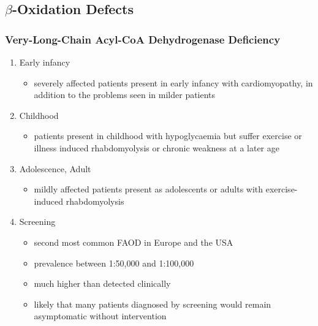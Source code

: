 \documentclass{scrartcl}
\begin{document}
\subsection{\(\beta\)-Oxidation Defects}
\label{sec:org9634dad}
\subsubsection{Very-Long-Chain Acyl-CoA Dehydrogenase Deficiency}
\label{sec:orgaae0151}
\begin{enumerate}
\item Early infancy
\label{sec:org3669950}
\begin{itemize}
\item severely affected patients present in early infancy with
cardiomyopathy, in addition to the problems seen in milder patients
\end{itemize}

\item Childhood
\label{sec:org2ffb412}
\begin{itemize}
\item patients present in childhood with hypoglycaemia but suffer exercise
or illness induced rhabdomyolysis or chronic weakness at a later age
\end{itemize}

\item Adolescence, Adult
\label{sec:orgd1780c0}
\begin{itemize}
\item mildly affected patients present as adolescents or adults with
exercise-induced rhabdomyolysis
\end{itemize}

\item Screening
\label{sec:org758c8eb}
\begin{itemize}
\item second most common FAOD in Europe and the USA
\item prevalence between 1:50,000 and 1:100,000
\item much higher than detected clinically
\item likely that many patients diagnosed by screening would remain
asymptomatic without intervention
\end{itemize}
\end{enumerate}
\end{document}
